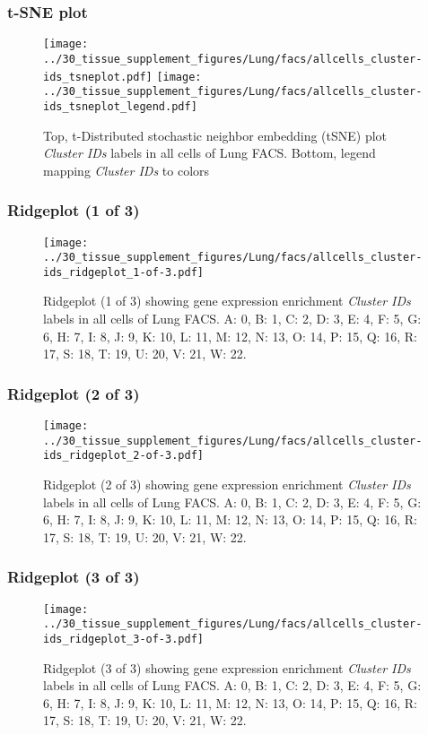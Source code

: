 \clearpage
\subsubsection{t-SNE plot}
\begin{figure}[h]
\centering
\texttt{[image: ../30\_tissue\_supplement\_figures/Lung/facs/allcells\_cluster-ids\_tsneplot.pdf]}
\texttt{[image: ../30\_tissue\_supplement\_figures/Lung/facs/allcells\_cluster-ids\_tsneplot\_legend.pdf]}
\caption{Top, t-Distributed stochastic neighbor embedding (tSNE) plot  \emph{Cluster IDs} labels in all cells of Lung FACS. Bottom, legend mapping \emph{Cluster IDs} to colors}
\end{figure}


\clearpage

\subsubsection{Ridgeplot (1 of 3)}
\begin{figure}[h]
\centering
\texttt{[image: ../30\_tissue\_supplement\_figures/Lung/facs/allcells\_cluster-ids\_ridgeplot\_1-of-3.pdf]}

\caption{ Ridgeplot (1 of 3)  showing gene expression enrichment \emph{Cluster IDs} labels in all cells of Lung FACS. A: 0, B: 1, C: 2, D: 3, E: 4, F: 5, G: 6, H: 7, I: 8, J: 9, K: 10, L: 11, M: 12, N: 13, O: 14, P: 15, Q: 16, R: 17, S: 18, T: 19, U: 20, V: 21, W: 22.}
\end{figure}


\clearpage

\subsubsection{Ridgeplot (2 of 3)}
\begin{figure}[h]
\centering
\texttt{[image: ../30\_tissue\_supplement\_figures/Lung/facs/allcells\_cluster-ids\_ridgeplot\_2-of-3.pdf]}

\caption{ Ridgeplot (2 of 3)  showing gene expression enrichment \emph{Cluster IDs} labels in all cells of Lung FACS. A: 0, B: 1, C: 2, D: 3, E: 4, F: 5, G: 6, H: 7, I: 8, J: 9, K: 10, L: 11, M: 12, N: 13, O: 14, P: 15, Q: 16, R: 17, S: 18, T: 19, U: 20, V: 21, W: 22.}
\end{figure}


\clearpage

\subsubsection{Ridgeplot (3 of 3)}
\begin{figure}[h]
\centering
\texttt{[image: ../30\_tissue\_supplement\_figures/Lung/facs/allcells\_cluster-ids\_ridgeplot\_3-of-3.pdf]}

\caption{ Ridgeplot (3 of 3)  showing gene expression enrichment \emph{Cluster IDs} labels in all cells of Lung FACS. A: 0, B: 1, C: 2, D: 3, E: 4, F: 5, G: 6, H: 7, I: 8, J: 9, K: 10, L: 11, M: 12, N: 13, O: 14, P: 15, Q: 16, R: 17, S: 18, T: 19, U: 20, V: 21, W: 22.}
\end{figure}


